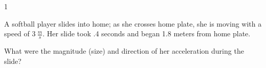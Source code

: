 
\AddToShipoutPicture*{\BackgroundPic}

\addtocounter {ProbNum} {1}

 
{\bf \Large{}} A softball player slides into home; as she crosses home plate, she is moving with a speed of ${3~\tfrac{m}{s}}$.  Her slide took .4 seconds and began 1.8 meters from home plate.  \bigskip

What were the magnitude (size) and direction of her acceleration during the slide? \vfill




\newpage
